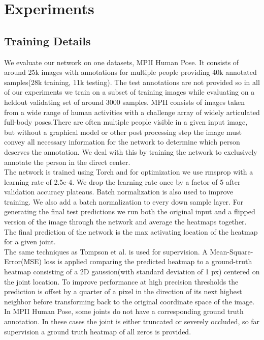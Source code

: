 \documentclass[final]{cvpr}
\begin{document}
\section{Experiments}
\subsection{Training Details}
We evaluate our network on one datasets, MPII Human Pose. It consists of  around 25k images with annotations for multiple people providing 40k  annotated samples(28k training, 11k testing). The test annotations are not provided so in all of our experiments we train on a subset of training images while evaluating on a heldout validating set of around 3000 samples. MPII consists of images taken from a wide range of human activities with a challenge array of widely articulated full-body poses.\indent There are often multiple people visible in a given input image, but without a graphical model or other post processing step the image must convey all necessary information for the network to determine which person deserves the annotation. We deal with this by training the network to exclusively annotate the person in the direct center.\\
\indent The network is trained using Torch and for optimization we use rmsprop with a learning rate of 2.5e-4. We drop the learning rate once by a factor of 5 after validation accuracy plateaus. Batch normalization\cite{ioffe2015batch} is also used to improve training. We also add a batch normalization to every down sample layer. For generating the final test predictions we run both the original input and a flipped version of the image through the network and average the heatmaps together. The final prediction of the network is the max activating location of the heatmap for a given joint.\\
\indent The same techniques as Tompson et al.\cite{tompson2014joint} is used for supervision. A Mean-Square-Error(MSE) loss is applied comparing the predicted heatmap to a ground-truth heatmap consisting of a 2D gaussion(with standard deviation of 1 px) centered on the joint location. To improve performance at high precision thresholds the prediction is offset by a quarter of a pixel in the direction of its next highest neighbor before transforming back to the original coordinate space of the image. In MPII Human Pose, some joints do not have a corresponding ground truth annotation. In these cases the joint is either truncated or severely occluded, so far supervision a ground truth heatmap of all zeros is provided.
\end{document}
